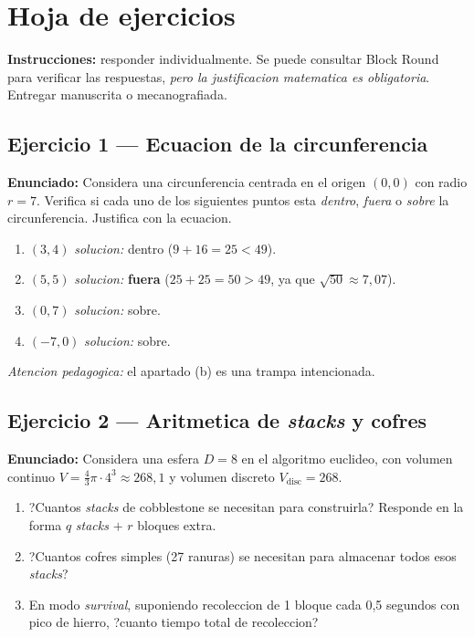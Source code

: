 \documentclass[12pt,a4paper]{scrartcl}
\newcommand{\acc}[1]{\textcolor{accent}{\textbf{#1}}}
\begin{document}
\newpage
\section{Hoja de ejercicios}\label{ap:exerc}

\textbf{Instrucciones:} responder individualmente. Se puede consultar Block Round para verificar las respuestas, \emph{pero la justificacion matematica es obligatoria}. Entregar manuscrita o mecanografiada.

\subsection*{Ejercicio 1 --- Ecuacion de la circunferencia}
\textbf{Enunciado:} Considera una circunferencia centrada en el origen $(0, 0)$ con radio $r = 7$. Verifica si cada uno de los siguientes puntos esta \emph{dentro}, \emph{fuera} o \emph{sobre} la circunferencia. Justifica con la ecuacion.
\begin{enumerate}[label=\alph*),leftmargin=1.5em,itemsep=0.1em,topsep=0.2em,nosep]
  \item $(3, 4)$ \hfill \emph{solucion:} dentro ($9 + 16 = 25 < 49$).
  \item $(5, 5)$ \hfill \emph{solucion:} \acc{fuera} ($25 + 25 = 50 > 49$, ya que $\sqrt{50} \approx 7{,}07$).
  \item $(0, 7)$ \hfill \emph{solucion:} sobre.
  \item $(-7, 0)$ \hfill \emph{solucion:} sobre.
\end{enumerate}

\textit{Atencion pedagogica:} el apartado (b) es una trampa intencionada.

\subsection*{Ejercicio 2 --- Aritmetica de \emph{stacks} y cofres}
\textbf{Enunciado:} Considera una esfera $D = 8$ en el algoritmo euclideo, con volumen continuo $V = \tfrac{4}{3}\pi \cdot 4^3 \approx 268{,}1$ y volumen discreto $V_{\mathrm{disc}} = 268$.
\begin{enumerate}[label=\alph*),leftmargin=1.5em,itemsep=0.1em,topsep=0.2em,nosep]
  \item ?Cuantos \emph{stacks} de cobblestone se necesitan para construirla? Responde en la forma $q$ \emph{stacks} $+$ $r$ bloques extra.
  \item ?Cuantos cofres simples (27 ranuras) se necesitan para almacenar todos esos \emph{stacks}?
  \item En modo \emph{survival}, suponiendo recoleccion de 1 bloque cada 0{,}5 segundos con pico de hierro, ?cuanto tiempo total de recoleccion?
\end{enumerate}
\end{document}
